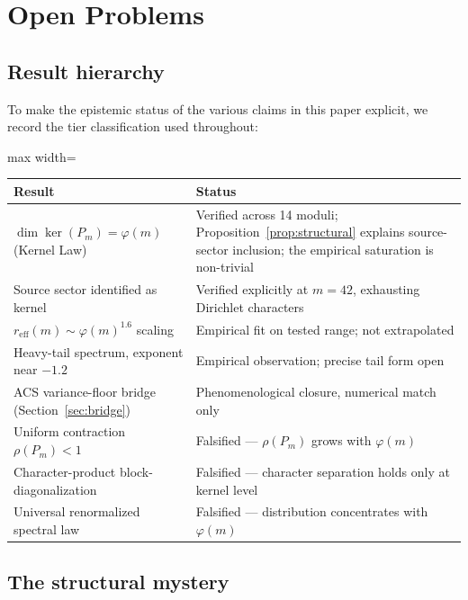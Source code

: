 \documentclass[11pt,a4paper]{article}
\begin{document}
\section{Open Problems}
\label{sec:open}

\subsection{Result hierarchy}

To make the epistemic status of the various claims in this paper explicit, we record the tier classification used throughout:

\begin{center}
\begin{adjustbox}{max width=\linewidth}\begin{tabular}{p{}p{}}
\toprule
\textbf{Result} & \textbf{Status} \\
\midrule
$\dim \ker(P_m) = \varphi(m)$ (Kernel Law) & Verified across 14 moduli; Proposition~\ref{prop:structural} explains source-sector inclusion; the empirical saturation is non-trivial \\
Source sector identified as kernel & Verified explicitly at $m = 42$, exhausting Dirichlet characters \\
$r_{\text{eff}}(m) \sim \varphi(m)^{1.6}$ scaling & Empirical fit on tested range; not extrapolated \\
Heavy-tail spectrum, exponent near $-1.2$ & Empirical observation; precise tail form open \\
ACS variance-floor bridge (Section~\ref{sec:bridge}) & Phenomenological closure, numerical match only \\
Uniform contraction $\rho(P_m) < 1$ & Falsified --- $\rho(P_m)$ grows with $\varphi(m)$ \\
Character-product block-diagonalization & Falsified --- character separation holds only at kernel level \\
Universal renormalized spectral law & Falsified --- distribution concentrates with $\varphi(m)$ \\
\bottomrule
\end{tabular}\end{adjustbox}
\end{center}

\subsection{The structural mystery}
\end{document}
